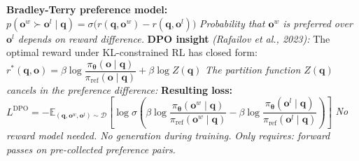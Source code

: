\documentclass[11pt]{article}
\begin{document}
\begin{algorithm}[t]
\caption{DPO Loss: From Reward Model to Closed-Form Objective}\label{alg:dpo-deriv}
\begin{algorithmic}[0]
\Statex \textbf{Bradley-Terry preference model:}
\Statex \hspace{\algorithmicindent} $p(\mathbf{o}^w \succ \mathbf{o}^l \mid \mathbf{q}) = \sigma\!\big(r(\mathbf{q}, \mathbf{o}^w) - r(\mathbf{q}, \mathbf{o}^l)\big)$
\Statex \hspace{\algorithmicindent} \textit{Probability that $\mathbf{o}^w$ is preferred over $\mathbf{o}^l$ depends on reward difference.}
\Statex
\Statex \textbf{DPO insight} \textit{(Rafailov et al., 2023):}
\Statex \hspace{\algorithmicindent} The optimal reward under KL-constrained RL has closed form:
\Statex \hspace{\algorithmicindent} $r^*(\mathbf{q}, \mathbf{o}) = \beta \log \dfrac{\pi_{\boldsymbol{\theta}}(\mathbf{o} \mid \mathbf{q})}{\pi_{\text{ref}}(\mathbf{o} \mid \mathbf{q})} + \beta \log Z(\mathbf{q})$
\Statex \hspace{\algorithmicindent} \textit{The partition function $Z(\mathbf{q})$ cancels in the preference difference:}
\Statex
\Statex \textbf{Resulting loss:}
\Statex \hspace{\algorithmicindent} $L^{\text{DPO}} = -\mathbb{E}_{(\mathbf{q}, \mathbf{o}^w, \mathbf{o}^l) \sim \mathcal{D}}\! \left[\log \sigma\!\left(\beta \log \dfrac{\pi_{\boldsymbol{\theta}}(\mathbf{o}^w \mid \mathbf{q})}{\pi_{\text{ref}}(\mathbf{o}^w \mid \mathbf{q})} - \beta \log \dfrac{\pi_{\boldsymbol{\theta}}(\mathbf{o}^l \mid \mathbf{q})}{\pi_{\text{ref}}(\mathbf{o}^l \mid \mathbf{q})}\right)\right]$
\Statex
\Statex \hspace{\algorithmicindent} \textit{No reward model needed. No generation during training.}
\Statex \hspace{\algorithmicindent} \textit{Only requires: forward passes on pre-collected preference pairs.}
\end{algorithmic}
\end{algorithm}
\end{document}
